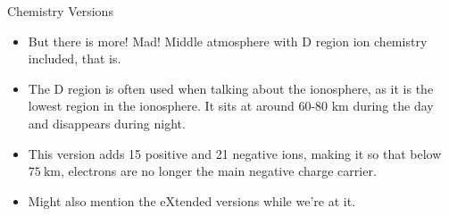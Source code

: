 \documentclass[xcolor=dvipsnames]{beamer} %
\begin{document}
\begin{frame}{Chemistry Versions}
{\begin{itemize}
            thus also has a reduced set of tropospheric reactions.
      \item But there is more! Mad! Middle atmosphere with D region ion chemistry
            included, that is.
      \item The D region is often used when talking about the ionosphere, as it is
            the lowest region in the ionosphere. It sits at around 60-80 km during
            the day and disappears during night.
      \item This version adds 15 positive and 21 negative ions, making it so that
            below $ \SI{75}{\kilo\metre} $, electrons are no longer the main
            negative charge carrier.
      \item Might also mention the eXtended versions while we're at it.
    \end{itemize}
  }
\end{frame}
\end{document}
